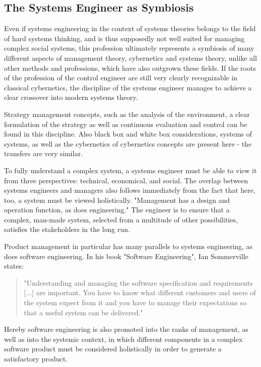 \documentclass[a4paper,12pt]{scrartcl}
\begin{document}
\subsection{The Systems Engineer as Symbiosis}	

Even if systems engineering in the context of systems theories belongs to the field of hard systems thinking, and is thus supposedly not well suited for managing complex social systems, this profession ultimately represents a symbiosis of many different aspects of management theory, cybernetics and systems theory, unlike all other methods and professions, which have also outgrown these fields. If the roots of the profession of the control engineer are still very clearly recognizable in classical cybernetics, the discipline of the systems engineer manages to achieve a clear crossover into modern systems theory.

Strategy management concepts, such as the analysis of the environment, a clear formulation of the strategy as well as continuous evaluation and control can be found in this discipline. Also black box and white box considerations, systems of systems, as well as the cybernetics of cybernetics concepts are present here - the transfers are very similar. 

To fully understand a complex system, a systems engineer must be able to view it from three perspectives: technical, economical, and social.
The overlap between systems engineers and managers also follows immediately from the fact that here, too, a system must be viewed holistically. "Management has a design and operation function, as does engineering."\cite{goode:1957} The engineer is to ensure that a complex, man-made system, selected from a multitude of other possibilities, satisfies the stakeholders in the long run.\cite{hossain:2019}

Product management in particular has many parallels to systems engineering, as does software engineering. In his book "Software Engineering", Ian Sommerville states:
\begin{quote}
"Understanding and managing the software specification and requirements [...] are important. You have to know what different customers and users of the system expect from it and you have to manage their expectations so that a useful system can be delivered."\cite{sommerville:2011}
\end{quote}
Hereby software engineering is also promoted into the ranks of management, as well as into the systemic context, in which different components in a complex software product must be considered holistically in order to generate a satisfactory product.
\end{document}
